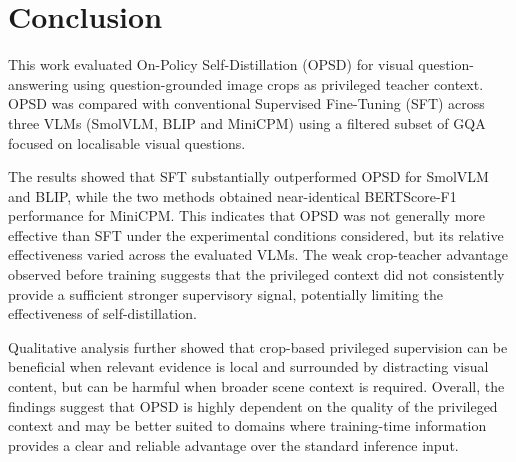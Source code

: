 \section{Conclusion}\label{conclusion}

This work evaluated On-Policy Self-Distillation (OPSD) for visual question-answering using question-grounded
image crops as privileged teacher context. OPSD was compared with conventional Supervised Fine-Tuning (SFT)
across three VLMs (SmolVLM, BLIP and MiniCPM) using a filtered subset of GQA focused on localisable visual questions.

The results showed that SFT substantially outperformed OPSD for SmolVLM and BLIP, while the two
methods obtained near-identical BERTScore-F1 performance for MiniCPM. This indicates that OPSD was not 
generally more effective than SFT under the experimental conditions considered, but its relative
effectiveness varied across the evaluated VLMs. The weak crop-teacher advantage observed before training
suggests that the privileged context did not consistently provide a sufficient stronger supervisory signal,
potentially limiting the effectiveness of self-distillation.

Qualitative analysis further showed that crop-based privileged supervision can be beneficial when relevant
evidence is local and surrounded by distracting visual content, but can be harmful when broader
scene context is required. Overall, the findings suggest that OPSD is highly dependent on the quality
of the privileged context and may be better suited to domains where training-time information provides 
a clear and reliable advantage over the standard inference input.

